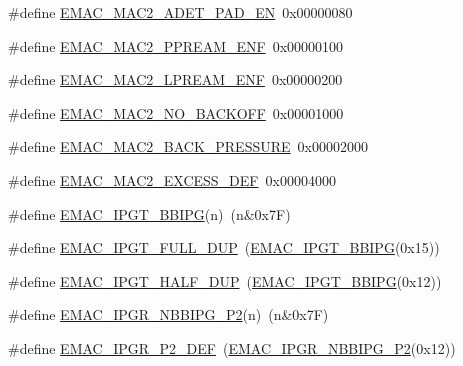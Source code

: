 \begin{DoxyCompactItemize}
\#define \hyperlink{group___e_m_a_c___private___macros_ga18d830c3035124228b92317bab42960a}{\-E\-M\-A\-C\-\_\-\-M\-A\-C2\-\_\-\-A\-D\-E\-T\-\_\-\-P\-A\-D\-\_\-\-E\-N}~0x00000080
\item 
\#define \hyperlink{group___e_m_a_c___private___macros_ga9bbae26e5123324d34f1d32588923ecf}{\-E\-M\-A\-C\-\_\-\-M\-A\-C2\-\_\-\-P\-P\-R\-E\-A\-M\-\_\-\-E\-N\-F}~0x00000100
\item 
\#define \hyperlink{group___e_m_a_c___private___macros_ga4190874bbcc1d6ea6b3fb10551a1561b}{\-E\-M\-A\-C\-\_\-\-M\-A\-C2\-\_\-\-L\-P\-R\-E\-A\-M\-\_\-\-E\-N\-F}~0x00000200
\item 
\#define \hyperlink{group___e_m_a_c___private___macros_gacd1e5404c36734e0dafcd7b6c4ef0cc3}{\-E\-M\-A\-C\-\_\-\-M\-A\-C2\-\_\-\-N\-O\-\_\-\-B\-A\-C\-K\-O\-F\-F}~0x00001000
\item 
\#define \hyperlink{group___e_m_a_c___private___macros_gabd22326b2aea8d53db1dbd6d82607588}{\-E\-M\-A\-C\-\_\-\-M\-A\-C2\-\_\-\-B\-A\-C\-K\-\_\-\-P\-R\-E\-S\-S\-U\-R\-E}~0x00002000
\item 
\#define \hyperlink{group___e_m_a_c___private___macros_ga7727a321d9e9c0273d7aed3d4b67ae5a}{\-E\-M\-A\-C\-\_\-\-M\-A\-C2\-\_\-\-E\-X\-C\-E\-S\-S\-\_\-\-D\-E\-F}~0x00004000
\item 
\#define \hyperlink{group___e_m_a_c___private___macros_ga743e61d06f8b2939757bf5281e834620}{\-E\-M\-A\-C\-\_\-\-I\-P\-G\-T\-\_\-\-B\-B\-I\-P\-G}(n)~(n\&0x7\-F)
\item 
\#define \hyperlink{group___e_m_a_c___private___macros_gab7bf3afef2412a77349711e2e88e0aa1}{\-E\-M\-A\-C\-\_\-\-I\-P\-G\-T\-\_\-\-F\-U\-L\-L\-\_\-\-D\-U\-P}~(\hyperlink{group___e_m_a_c___private___macros_ga743e61d06f8b2939757bf5281e834620}{\-E\-M\-A\-C\-\_\-\-I\-P\-G\-T\-\_\-\-B\-B\-I\-P\-G}(0x15))
\item 
\#define \hyperlink{group___e_m_a_c___private___macros_gad4771025321fbd32b63ea62452759cb9}{\-E\-M\-A\-C\-\_\-\-I\-P\-G\-T\-\_\-\-H\-A\-L\-F\-\_\-\-D\-U\-P}~(\hyperlink{group___e_m_a_c___private___macros_ga743e61d06f8b2939757bf5281e834620}{\-E\-M\-A\-C\-\_\-\-I\-P\-G\-T\-\_\-\-B\-B\-I\-P\-G}(0x12))
\item 
\#define \hyperlink{group___e_m_a_c___private___macros_ga96fd23b75371f1f4b5685b00fefd4152}{\-E\-M\-A\-C\-\_\-\-I\-P\-G\-R\-\_\-\-N\-B\-B\-I\-P\-G\-\_\-\-P2}(n)~(n\&0x7\-F)
\item 
\#define \hyperlink{group___e_m_a_c___private___macros_ga3ba8c2d804d34874f1e90250d1782e67}{\-E\-M\-A\-C\-\_\-\-I\-P\-G\-R\-\_\-\-P2\-\_\-\-D\-E\-F}~(\hyperlink{group___e_m_a_c___private___macros_ga96fd23b75371f1f4b5685b00fefd4152}{\-E\-M\-A\-C\-\_\-\-I\-P\-G\-R\-\_\-\-N\-B\-B\-I\-P\-G\-\_\-\-P2}(0x12))

\end{DoxyCompactItemize}
